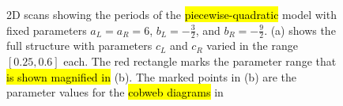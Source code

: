 \begin{figure}
	\centering
	\caption[2D scans showing periods of the even piecewise quadratic model]{
		2D scans showing the periods of the \hl{piecewise-quadratic} model with fixed parameters $a_L = a_R = 6$, $b_L = -\frac{3}{2}$, and $b_R = -\frac{9}{2}$.
		(a) shows the full structure with parameters $c_L$ and $c_R$ varied in the range $[0.25, 0.6]$ each.
		The red rectangle marks the parameter range that \hl{is shown magnified in} (b).
		The marked points in (b) are the parameter values for the \hl{cobweb diagrams} in 
	}
\end{figure}


